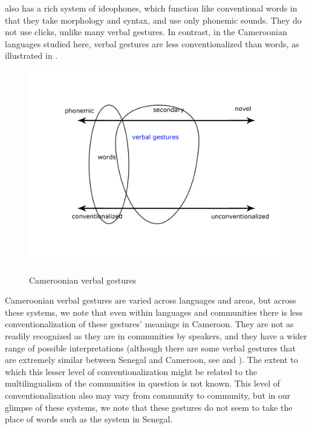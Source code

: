 \documentclass[output=paper
,newtxmath
,modfonts
,nonflat]{langsci/langscibook}
\begin{document}
 also has a rich system of ideophones, which function like conventional words in that they take morphology and syntax, and use only phonemic sounds.  They do not use  clicks, unlike many  verbal gestures. In contrast, in the Cameroonian languages studied here, verbal gestures are less conventionalized than words, as illustrated in .


\begin{figure} 
\includegraphics[scale=0.15]{figures/cameroonsystem.jpg}\\
\caption{Cameroonian verbal gestures}
\label{fig:pillion:cam}
\end{figure}

Cameroonian verbal gestures are varied across languages and areas, but across these systems, we note that even within languages and communities there is less conventionalization of these gestures' meanings in Cameroon. They are not as readily recognized as they are in  communities by speakers, and they have a wider range of possible interpretations (although there are some verbal gestures that are extremely similar between Senegal and Cameroon, see  and ). The extent to which this lesser level of conventionalization might be related to the multilingualism of the communities in question is not known. This level of conventionalization also may vary from community to community, but in our glimpse of these systems, we note that these gestures do not seem to take the place of words such as the system in Senegal. 
\end{document}
